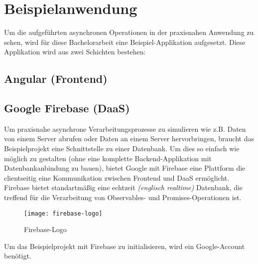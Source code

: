 \section{Beispielanwendung}

Um die aufgeführten asynchronen Operationen in der praxisnahen Anwendung zu sehen, wird für diese Bachelorarbeit eine Beispiel-Applikation aufgesetzt. Diese Applikation wird aus zwei Schichten bestehen:

\subsection{Angular (Frontend)}

\subsection{Google Firebase (DaaS)}
Um praxisnahe asynchrone Verarbeitungsprozesse zu simulieren wie z.B. Daten von einem Server abrufen oder Daten an einem Server hervorbringen, braucht das Beispielprojekt eine Schnittstelle zu einer Datenbank. Um dies so einfach wie möglich zu gestalten (ohne eine komplette Backend-Applikation mit Datenbankanbindung zu bauen), bietet Google mit Firebase eine Plattform die clientseitig eine Kommunikation zwischen Frontend und DaaS ermöglicht. Firebase bietet standartmäßig eine echtzeit \textit{(englisch \glqq{}realtime\grqq{})} Datenbank, die treffend für die Verarbeitung von Observables- und Promises-Operationen ist.

\begin{figure}[H]
\centering
\texttt{[image: firebase-logo]}
\caption{Firebase-Logo\cite{firebase}}
\end{figure}

Um das Beispielprojekt mit Firebase zu initialisieren, wird ein Google-Account benötigt.